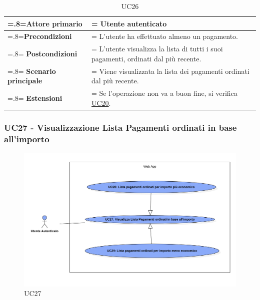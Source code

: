             \begin{table}[H]
                \centering
                \renewcommand{\arraystretch}{1.8}
                \renewcommand\tabularxcolumn[1]{m{#1}}
                \begin{tabularx}{0.9\textwidth} {
                    >{\hsize=.8\hsize\linewidth=\hsize}X
                    >{\hsize=1.2\hsize\linewidth=\hsize}X}
                    \hline
                    \textbf{Attore primario} & Utente autenticato \\
                    \hline
                    \textbf{Precondizioni} & L'utente ha effettuato almeno un pagamento. \\
                    \hline
                    \textbf{Postcondizioni} & L'utente visualizza la lista di tutti i suoi pagamenti, ordinati dal più recente. \\
                    \hline
                    \textbf{Scenario principale} & Viene visualizzata la lista dei pagamenti ordinati dal più recente. \\
                    \hline
                    \textbf{Estensioni} & Se l'operazione non va a buon fine, si verifica \hyperref[UC20]{UC20}. \\
                    \hline
                \end{tabularx}
                \caption{UC26}
            \end{table}

            \subsubsection{UC27 - Visualizzazione Lista Pagamenti ordinati in base all'importo}
        \label{UC27}

        \begin{figure}[H]
            \centering
            \includegraphics[scale=0.4]{src/img/UC27.png}
            \caption{UC27}
        \end{figure}

